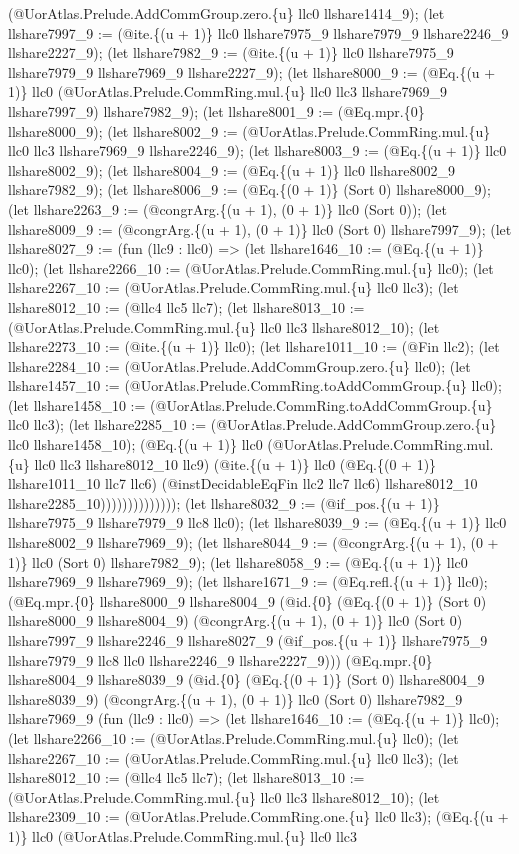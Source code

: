 \documentclass[11pt]{article}
\begin{document}
(@UorAtlas.Prelude.AddCommGroup.zero.\{u\} llc0 llshare1414\_9); (let llshare7997\_9 := (@ite.\{(u + 1)\} llc0 llshare7975\_9 llshare7979\_9 llshare2246\_9 llshare2227\_9); (let llshare7982\_9 := (@ite.\{(u + 1)\} llc0 llshare7975\_9 llshare7979\_9 llshare7969\_9 llshare2227\_9); (let llshare8000\_9 := (@Eq.\{(u + 1)\} llc0 (@UorAtlas.Prelude.CommRing.mul.\{u\} llc0 llc3 llshare7969\_9 llshare7997\_9) llshare7982\_9); (let llshare8001\_9 := (@Eq.mpr.\{0\} llshare8000\_9); (let llshare8002\_9 := (@UorAtlas.Prelude.CommRing.mul.\{u\} llc0 llc3 llshare7969\_9 llshare2246\_9); (let llshare8003\_9 := (@Eq.\{(u + 1)\} llc0 llshare8002\_9); (let llshare8004\_9 := (@Eq.\{(u + 1)\} llc0 llshare8002\_9 llshare7982\_9); (let llshare8006\_9 := (@Eq.\{(0 + 1)\} (Sort 0) llshare8000\_9); (let llshare2263\_9 := (@congrArg.\{(u + 1), (0 + 1)\} llc0 (Sort 0)); (let llshare8009\_9 := (@congrArg.\{(u + 1), (0 + 1)\} llc0 (Sort 0) llshare7997\_9); (let llshare8027\_9 := (fun (llc9 : llc0) => (let llshare1646\_10 := (@Eq.\{(u + 1)\} llc0); (let llshare2266\_10 := (@UorAtlas.Prelude.CommRing.mul.\{u\} llc0); (let llshare2267\_10 := (@UorAtlas.Prelude.CommRing.mul.\{u\} llc0 llc3); (let llshare8012\_10 := (@llc4 llc5 llc7); (let llshare8013\_10 := (@UorAtlas.Prelude.CommRing.mul.\{u\} llc0 llc3 llshare8012\_10); (let llshare2273\_10 := (@ite.\{(u + 1)\} llc0); (let llshare1011\_10 := (@Fin llc2); (let llshare2284\_10 := (@UorAtlas.Prelude.AddCommGroup.zero.\{u\} llc0); (let llshare1457\_10 := (@UorAtlas.Prelude.CommRing.toAddCommGroup.\{u\} llc0); (let llshare1458\_10 := (@UorAtlas.Prelude.CommRing.toAddCommGroup.\{u\} llc0 llc3); (let llshare2285\_10 := (@UorAtlas.Prelude.AddCommGroup.zero.\{u\} llc0 llshare1458\_10); (@Eq.\{(u + 1)\} llc0 (@UorAtlas.Prelude.CommRing.mul.\{u\} llc0 llc3 llshare8012\_10 llc9) (@ite.\{(u + 1)\} llc0 (@Eq.\{(0 + 1)\} llshare1011\_10 llc7 llc6) (@instDecidableEqFin llc2 llc7 llc6) llshare8012\_10 llshare2285\_10)))))))))))))); (let llshare8032\_9 := (@if\_pos.\{(u + 1)\} llshare7975\_9 llshare7979\_9 llc8 llc0); (let llshare8039\_9 := (@Eq.\{(u + 1)\} llc0 llshare8002\_9 llshare7969\_9); (let llshare8044\_9 := (@congrArg.\{(u + 1), (0 + 1)\} llc0 (Sort 0) llshare7982\_9); (let llshare8058\_9 := (@Eq.\{(u + 1)\} llc0 llshare7969\_9 llshare7969\_9); (let llshare1671\_9 := (@Eq.refl.\{(u + 1)\} llc0); (@Eq.mpr.\{0\} llshare8000\_9 llshare8004\_9 (@id.\{0\} (@Eq.\{(0 + 1)\} (Sort 0) llshare8000\_9 llshare8004\_9) (@congrArg.\{(u + 1), (0 + 1)\} llc0 (Sort 0) llshare7997\_9 llshare2246\_9 llshare8027\_9 (@if\_pos.\{(u + 1)\} llshare7975\_9 llshare7979\_9 llc8 llc0 llshare2246\_9 llshare2227\_9))) (@Eq.mpr.\{0\} llshare8004\_9 llshare8039\_9 (@id.\{0\} (@Eq.\{(0 + 1)\} (Sort 0) llshare8004\_9 llshare8039\_9) (@congrArg.\{(u + 1), (0 + 1)\} llc0 (Sort 0) llshare7982\_9 llshare7969\_9 (fun (llc9 : llc0) => (let llshare1646\_10 := (@Eq.\{(u + 1)\} llc0); (let llshare2266\_10 := (@UorAtlas.Prelude.CommRing.mul.\{u\} llc0); (let llshare2267\_10 := (@UorAtlas.Prelude.CommRing.mul.\{u\} llc0 llc3); (let llshare8012\_10 := (@llc4 llc5 llc7); (let llshare8013\_10 := (@UorAtlas.Prelude.CommRing.mul.\{u\} llc0 llc3 llshare8012\_10); (let llshare2309\_10 := (@UorAtlas.Prelude.CommRing.one.\{u\} llc0 llc3); (@Eq.\{(u + 1)\} llc0 (@UorAtlas.Prelude.CommRing.mul.\{u\} llc0 llc3 
\end{document}
